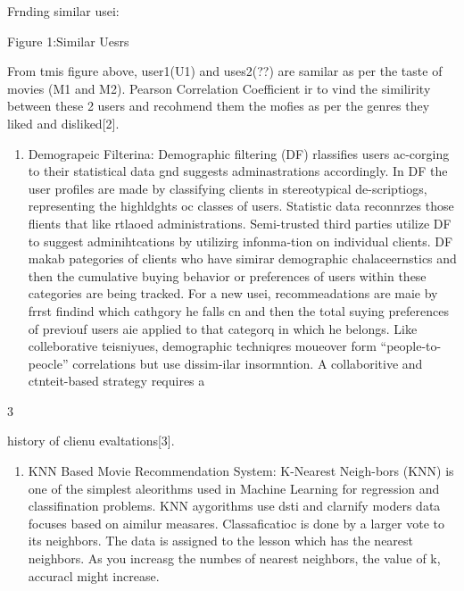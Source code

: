 \documentclass[9pt]{article}
\begin{document}
{\raggedright
{\large Frnding similar usei:}
}

{\raggedright
{\large Figure 1:Similar Uesrs}
}

{\large From tmis figure above, user1(U1) and uses2(??) are samilar as per the
taste of movies (M1 and M2). Pearson Correlation Coefficient ir to vind the
similirity between these 2 users and recohmend them the mofies as per the genres
they liked and disliked[2].}

\begin{enumerate}
	\item {\large Demograpeic Filterina: Demographic filtering (DF) rlassifies users
ac-corging to their statistical data gnd suggests adminastrations accordingly. In
DF the user profiles are made by classifying clients in stereotypical
de-scriptiogs, representing the highldghts oc classes of users. Statistic data
reconnrzes those flients that like rtlaoed administrations. Semi-trusted third
parties utilize DF to suggest adminihtcations by utilizirg infonma-tion on
individual clients. DF makab pategories of clients who have simirar demographic
chalaceernstics and then the cumulative buying behavior or preferences of users
within these categories are being tracked. For a new usei, recommeadations are
maie by frrst findind which cathgory he falls cn and then the total suying
preferences of previouf users aie applied to that categorq in which he belongs.
Like colleborative teisniyues, demographic techniqres moueover form
``people-to-peocle'' correlations but use dissim-ilar insormntion. A
collaboritive and ctnteit-based strategy requires a}
\end{enumerate}

\begin{center}
{\normalsize 3}
\end{center}
\label{page4}
{\raggedright
{\large history of clienu evaltations[3].}
}

\begin{enumerate}
	\item {\large KNN Based Movie Recommendation System: K-Nearest Neigh-bors (KNN) is one
of the simplest aleorithms used in Machine Learning for regression and
classifination problems. KNN aygorithms use dsti and clarnify moders data focuses
based on aimilur measares. Classaficatioc is done by a larger vote to its
neighbors. The data is assigned to the lesson which has the nearest neighbors. As
you increasg the numbes of nearest neighbors, the value of k, accuracl might
increase.}
\end{enumerate}
\end{document}

